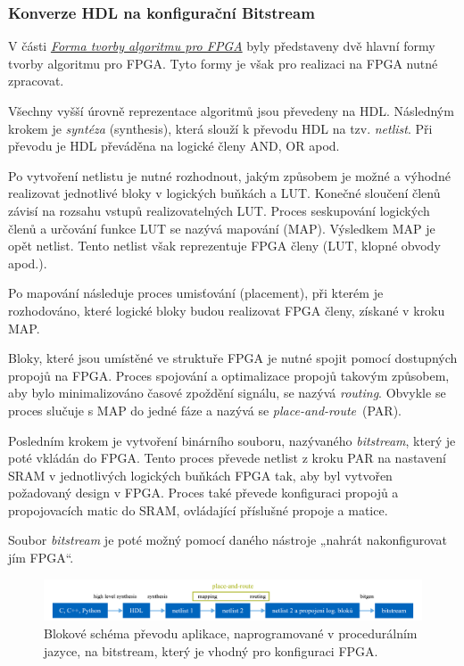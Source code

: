 \documentclass[a4paper, twoside, 11pt]{article}
\begin{document}
		\subsubsection{Konverze HDL na konfigurační Bitstream}
			V části \hyperref[subsubsec:forma-tvorby-algoritmu-pro-fpga]{\textit{Forma tvorby algoritmu pro FPGA}} byly představeny dvě hlavní formy tvorby algoritmu pro FPGA. Tyto formy je však pro realizaci na FPGA nutné zpracovat.\par
			Všechny vyšší úrovně reprezentace algoritmů jsou převedeny na HDL. Následným krokem je \textit{syntéza} (synthesis), která slouží k převodu HDL na tzv. \textit{netlist}. Při převodu je HDL převáděna na logické členy AND, OR apod. \cite{Sass2010}\par
			Po vytvoření netlistu je nutné rozhodnout, jakým způsobem je možné a výhodné realizovat jednotlivé bloky v logických buňkách a LUT. Konečné sloučení členů závisí na rozsahu vstupů realizovatelných LUT. Proces seskupování logických členů a určování funkce LUT se nazývá mapování (MAP). Výsledkem MAP je opět netlist. Tento netlist však reprezentuje FPGA členy (LUT, klopné obvody apod.). \cite{Sass2010}\par
			Po mapování následuje proces umisťování (placement), při kterém je rozhodováno, které logické bloky budou realizovat FPGA členy, získané v kroku MAP. \cite{Sass2010}\par
			Bloky, které jsou umístěné ve struktuře FPGA je nutné spojit pomocí dostupných propojů na FPGA. Proces spojování a optimalizace propojů takovým způsobem, aby bylo minimalizováno časové zpoždění signálu, se nazývá \textit{routing}. Obvykle se proces slučuje s MAP do jedné fáze a nazývá se \textit{place-and-route}~(PAR). \cite{Sass2010} \par
			Posledním krokem je vytvoření binárního souboru, nazývaného \textit{bitstream}, který je poté vkládán do FPGA. Tento proces převede netlist z kroku PAR na nastavení SRAM v jednotlivých logických buňkách FPGA tak, aby byl vytvořen požadovaný design v FPGA. Proces také převede konfiguraci propojů a propojovacích matic do SRAM, ovládající příslušné propoje a matice. \cite{Sass2010}\par
			Soubor \textit{bitstream} je poté možný pomocí daného nástroje „nahrát nakonfigurovat jím FPGA“.

			
			\begin{figure}[htbp!]
				\centering
					\includegraphics[width=1\textwidth]{src/pdf/fpga-hls-to-bitstream-flow-chart.pdf} 
					\caption{Blokové schéma převodu aplikace, naprogramované v procedurálním jazyce, na bitstream, který je vhodný pro konfiguraci FPGA.}
					\label{fig:fpga-hls-to-bitstream-flow-chart}
			\end{figure}
\end{document}
